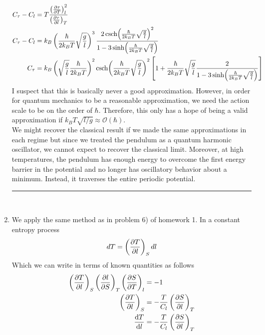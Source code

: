 \documentclass[]{book}
\begin{document}
\begin{enumerate}[1)]
\begin{equation}
\begin{split}
C_\tau - C_l & = T\frac{\left( \pdv{\tau}{T}\right)_{l}^2 }{\left( \pdv{\tau}{l}\right)_{T}} \\
C_\tau - C_l & = k_B \left( \frac{\hbar}{2k_BT}\sqrt{\frac{g}{l}}\right)^3 \frac{2\csch(\frac{\hbar}{2k_BT}\sqrt{\frac{g}{l}})^2}{1 - 3\sinh(\frac{\hbar}{2k_BT}\sqrt{\frac{g}{l}})} \\ 
C_\tau & = k_B  \left(\sqrt{\frac{g}{l}} \frac{\hbar}{2k_BT}\right)^2 \csch(\frac{\hbar}{2k_BT}\sqrt{\frac{g}{l}})^2  \left[ 1 + \frac{\hbar}{2k_BT}\sqrt{\frac{g}{l}} \frac{2}{1 - 3\sinh(\frac{\hbar}{2k_BT}\sqrt{\frac{g}{l}})} \right]
\end{split}
\end{equation}
I suspect that this is basically never a good approximation. However, in order for quantum mechanics to be a reasonable approximation, we need the action scale to be on the order of $\hbar$. Therefore, this only has a hope of being a valid approximation if $k_BT \sqrt{l/g} \approx \mathcal{O}(\hbar)$. \\
We might recover the classical result if we made the same approximations in each regime but since we treated the pendulum as a quantum harmonic oscillator, we cannot expect to recover the classical limit. Moreover, at high temperatures, the pendulum has enough energy to overcome the first energy barrier in the potential and no longer has oscillatory behavior about a minimum. Instead, it traverses the entire periodic potential. \\
\noindent\rule{15cm}{0.4pt} \\
\item 
We apply the same method as in problem 6) of homework 1. In a constant entropy process \\
\begin{equation}
\begin{split}
dT & = \left(\pdv{T}{l} \right)_{S} dl \\
\end{split}
\end{equation}
Which we can write in terms of known quantities as follows
\begin{equation}
\begin{split}
\left(\pdv{T}{l} \right)_{S} \left(\pdv{l}{S}\right)_{T} \left(\pdv{S}{T}\right)_{l} & = -1 \\
\left(\pdv{T}{l} \right)_{S} & = - \frac{T}{C_l}  \left(\pdv{S}{l}\right)_{T} \\
\dv{T}{l} & =   - \frac{T}{C_l}  \left(\pdv{S}{l}\right)_{T}  \\

\end{split}
\end{equation}
\end{enumerate}
\end{document}
